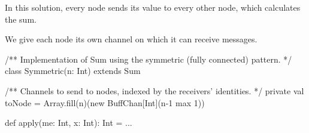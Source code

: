 \documentclass[notes,color]{sepslide0}
\begin{document}













\begin{slide}

In this solution, every node sends its value to every other node, which
calculates the sum.

We give each node its own channel on which it can receive messages.
\begin{scala}
/** Implementation of Sum using the symmetric (fully connected) pattern. */
class Symmetric(n: Int) extends Sum{
  /** Channels to send to nodes, indexed by the receivers' identities. */
  private val toNode = Array.fill(n)(new BuffChan[Int](n-1 max 1))

  def apply(me: Int, x: Int): Int = ...
}
\end{scala}
\end{slide}
\end{document}
